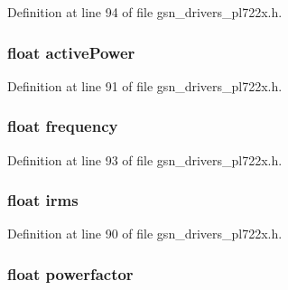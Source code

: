 Definition at line 94 of file gsn\_\-drivers\_\-pl722x.h.

\hypertarget{a00450_aabf327ff94458c4f133aec441d0de13c}{
\subsubsection[{activePower}]{\setlength{\rightskip}{0pt plus 5cm}float {\bf activePower}}}
\label{a00450_aabf327ff94458c4f133aec441d0de13c}


Definition at line 91 of file gsn\_\-drivers\_\-pl722x.h.

\hypertarget{a00450_acdfc8898c9e67fbcec81f3b04ae61bd9}{
\subsubsection[{frequency}]{\setlength{\rightskip}{0pt plus 5cm}float {\bf frequency}}}
\label{a00450_acdfc8898c9e67fbcec81f3b04ae61bd9}


Definition at line 93 of file gsn\_\-drivers\_\-pl722x.h.

\hypertarget{a00450_af9b0db3f42bdf3f755afe229084986a8}{
\subsubsection[{irms}]{\setlength{\rightskip}{0pt plus 5cm}float {\bf irms}}}
\label{a00450_af9b0db3f42bdf3f755afe229084986a8}


Definition at line 90 of file gsn\_\-drivers\_\-pl722x.h.

\hypertarget{a00450_a29927bc0ca13e270d492593d749bf42e}{
\subsubsection[{powerfactor}]{\setlength{\rightskip}{0pt plus 5cm}float {\bf powerfactor}}}
\label{a00450_a29927bc0ca13e270d492593d749bf42e}


